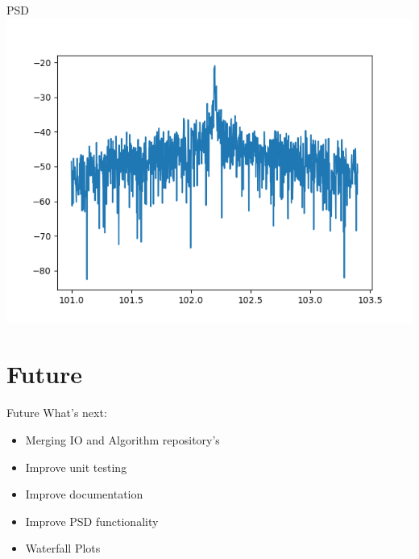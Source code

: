 \documentclass{beamer}
\begin{document}
\begin{frame}{PSD}
	\includegraphics[scale=0.6]{psd}
\end{frame}

\section{Future}

\begin{frame}{Future}
    What's next:       
    \begin{itemize}
        \item Merging IO and Algorithm repository's
        \item Improve unit testing
        \item Improve documentation
        \item Improve PSD functionality
        \item Waterfall Plots
    \end{itemize}
\end{frame}
\end{document}

